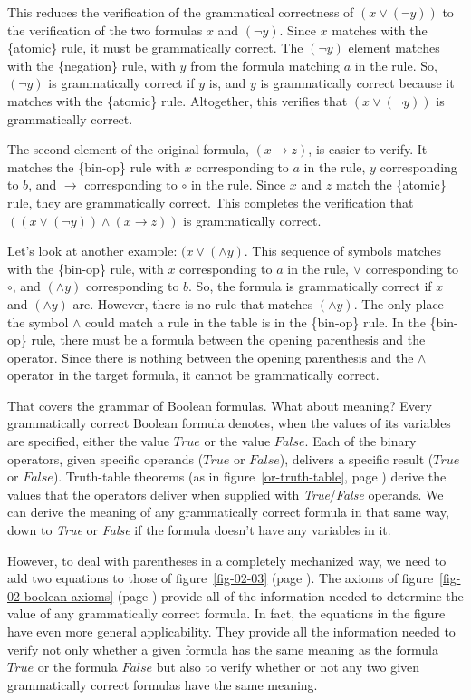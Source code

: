 This reduces the verification of the grammatical correctness of $(x \vee (\neg y))$
to the verification of the two formulas $x$ and $(\neg y)$.
Since $x$ matches with the \{atomic\} rule, it must be grammatically correct.
The $(\neg y)$ element matches with the \{negation\} rule,
with $y$ from the formula matching $a$ in the rule.
So, $(\neg y)$ is grammatically correct if $y$ is,
and $y$ is grammatically correct because it matches with the \{atomic\} rule.
Altogether, this verifies that $(x \vee (\neg y))$ is grammatically correct.

The second element of the original formula,
$(x \rightarrow z)$, is easier to verify.
It matches the \{bin-op\} rule with $x$ corresponding to $a$ in the rule,
$y$ corresponding to $b$, and $\rightarrow$ corresponding to $\circ$ in the rule.
Since $x$ and $z$ match the \{atomic\} rule, they are grammatically correct.
This completes the verification that
$((x \vee (\neg y)) \wedge (x \rightarrow z))$
is grammatically correct.

Let's look at another example: $(x \vee (\wedge y)$.
This sequence of symbols matches with the \{bin-op\} rule,
with $x$ corresponding to $a$ in the rule,
$\vee$ corresponding to $\circ$,
and $(\wedge y)$ corresponding to $b$.
So, the formula is grammatically correct
if $x$ and $(\wedge y)$ are.
However, there is no rule that matches $(\wedge y)$.
The only place the symbol $\wedge$ could match a rule
in the table is in the \{bin-op\} rule.
In the \{bin-op\} rule, there must be
a formula between
the opening parenthesis and the operator.
Since there is nothing
between the opening parenthesis
and the $\wedge$ operator in the target formula,
it cannot be grammatically correct.

That covers the grammar of Boolean formulas.
What about meaning?
Every grammatically correct Boolean formula denotes,
when the values of its variables are specified,
either the value $True$ or the value $False$.
Each of the binary operators, given specific operands ($True$ or $False$),
delivers a specific result ($True$ or $False$).
Truth-table theorems
(as in figure~\ref{or-truth-table}, page \pageref{or-truth-table})
derive the values that the operators deliver when
supplied with \emph{True}/\emph{False} operands.
We can derive the meaning of any grammatically correct formula
in that same way, down to \emph{True} or \emph{False} if the formula
doesn't have any variables in it.

However, to deal with parentheses in a completely mechanized way,
we need to add two equations
to those of figure~\ref{fig-02-03} (page \pageref{fig-02-03}).
The axioms of figure~\ref{fig-02-boolean-axioms} (page \pageref{fig-02-boolean-axioms})
provide all of the information needed to determine
the value of any grammatically correct formula.
In fact, the equations in the figure have even more general applicability.
They provide all the information needed
to verify not only whether a given formula
has the same meaning as the formula $True$ or the formula $False$
but also to verify whether or not any two given
grammatically correct formulas have the same meaning.

